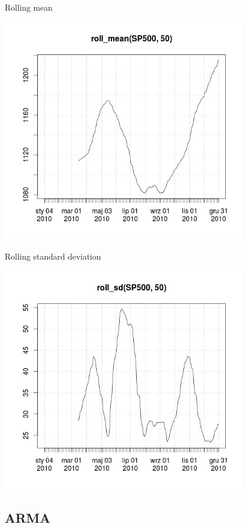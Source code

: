 \documentclass{beamer}
\begin{document}
\begin{frame}{Rolling mean}
\begin{center}
\includegraphics[width=0.8\textwidth]{img/roll_mean.png}
\end{center}
\end{frame}

\begin{frame}{Rolling standard deviation}
\begin{center}
\includegraphics[width=0.8\textwidth]{img/roll_sd.png}
\end{center}
\end{frame}

\subsection{ARMA}
\end{document}
